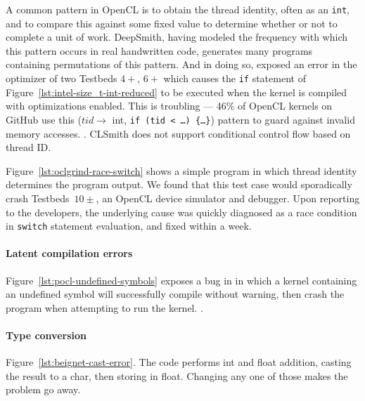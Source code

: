 A common pattern in OpenCL is to obtain the thread identity, often as an \texttt{int}, and to compare this against some fixed value to determine whether or not to complete a unit of work. DeepSmith, having modeled the frequency with which this pattern occurs in real handwritten code, generates many programs containing permutations of this pattern. And in doing so, exposed an error in the optimizer of two Testbeds $4+$, $6+$ which causes the \texttt{if} statement of Figure~\ref{lst:intel-size_t-int-reduced} to be executed when the kernel is compiled with optimizations enabled.
%
 This is troubling --- 46\% of OpenCL kernels on GitHub use this ($tid \rightarrow$ int, \texttt{if (tid < \ldots) \{\ldots\}}) pattern to guard against invalid memory accesses. . CLSmith does not support conditional control flow based on thread ID. %

Figure~\ref{lst:oclgrind-race-switch} shows a simple program in which thread identity determines the program output. We found that this test case would sporadically crash Testbeds~$10\pm$, an OpenCL device simulator and debugger. Upon reporting to the developers, the underlying cause was quickly diagnosed as a race condition in \texttt{switch} statement evaluation, and fixed within a week.

\paragraph{Latent compilation errors} Figure~\ref{lst:pocl-undefined-symbols} exposes a bug in in which a kernel containing an undefined symbol will successfully compile without warning, then crash the program when attempting to run the kernel. .

\paragraph{Type conversion} Figure~\ref{lst:beignet-cast-error}. The code performs int and float addition, casting the result to a char, then storing in float. Changing any one of those makes the problem go away.


